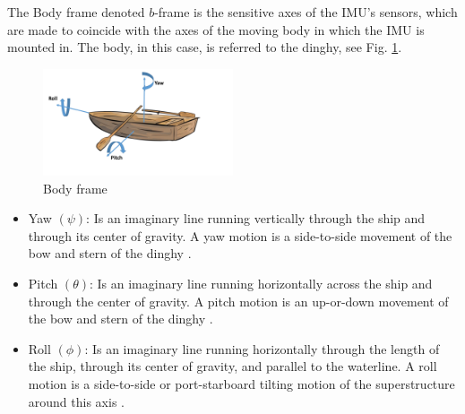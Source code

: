 The Body frame denoted $b$-frame is the sensitive axes of the IMU's sensors, which are made to coincide with the axes of the moving body in which the IMU is mounted in. The body, in this case, is referred to the dinghy, see Fig. \ref{Fig:body_frame}.

\begin{figure}[H]
\centering
\includegraphics[width=0.5\textwidth]{Figures/Euler_angle.pdf}
\caption{Body frame}
\label{Fig:body_frame}
\end{figure}
\begin{itemize}
\item Yaw $(\psi)$: Is an imaginary line running vertically through the ship and through its center of gravity. A yaw motion is a side-to-side movement of the bow and stern of the dinghy \cite{SNAME}.
\item Pitch $(\theta)$: Is an imaginary line running horizontally across the ship and through the center of gravity. A pitch motion is an up-or-down movement of the bow and stern of the dinghy \cite{SNAME}.
\item Roll $(\phi)$: Is an imaginary line running horizontally through the length of the ship, through its center of gravity, and parallel to the waterline. A roll motion is a side-to-side or port-starboard tilting motion of the superstructure around this axis \cite{SNAME}.
\end{itemize}

